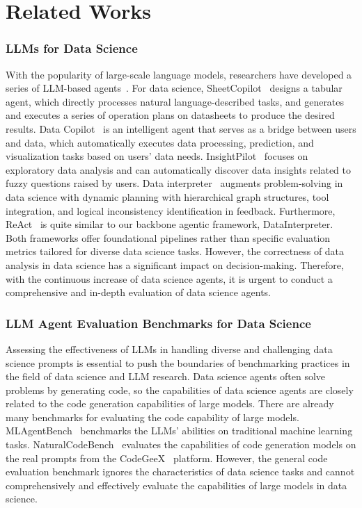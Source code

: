\section{Related Works}
\label{sec: related_works}
\subsubsection{LLMs for Data Science} 
With the popularity of large-scale language models, researchers have developed a series of LLM-based agents~\cite{yao2022react, wang2024battleagentbench, xu2024androidlab, xia2024scenegenagent}. 
For data science, SheetCopilot~\citep{li2024sheetcopilot} designs a tabular agent, which directly processes natural language-described tasks, and generates and executes a series of operation plans on datasheets to produce the desired results. 
Data Copilot~\citep{zhang2024data} is an intelligent agent that serves as a bridge between users and data, which automatically executes data processing, prediction, and visualization tasks based on users' data needs.
InsightPilot~\citep{ma2023insightpilot} focuses on exploratory data analysis and can automatically discover data insights related to fuzzy questions raised by users.
Data interpreter~\citep{hong2024datainterpreter} augments problem-solving in data science with dynamic planning with hierarchical graph structures, tool integration, and logical inconsistency identification in feedback.
Furthermore, ReAct~\cite{yao2022react} is quite similar to our backbone agentic framework, DataInterpreter. Both frameworks offer foundational pipelines rather than specific evaluation metrics tailored for diverse data science tasks.
However, the correctness of data analysis in data science has a significant impact on decision-making.
Therefore, with the continuous increase of data science agents, it is urgent to conduct a comprehensive and in-depth evaluation of data science agents.


\subsubsection{LLM Agent Evaluation Benchmarks for Data Science}

Assessing the effectiveness of LLMs in handling diverse and challenging data science prompts is essential to push the boundaries of benchmarking practices in the field of data science and LLM research.
Data science agents often solve problems by generating code, so the capabilities of data science agents are closely related to the code generation capabilities of large models. 
There are already many benchmarks for evaluating the code capability of large models.
MLAgentBench~\citep{huang2023mlbenchmarking} benchmarks the LLMs' abilities on traditional machine learning tasks.
NaturalCodeBench~\citep{zhang2024naturalcodebench} evaluates the capabilities of code generation models on the real prompts from the CodeGeeX~\citep{zheng2023codegeex} platform.
However, the general code evaluation benchmark ignores the characteristics of data science tasks and cannot comprehensively and effectively evaluate the capabilities of large models in data science. 

